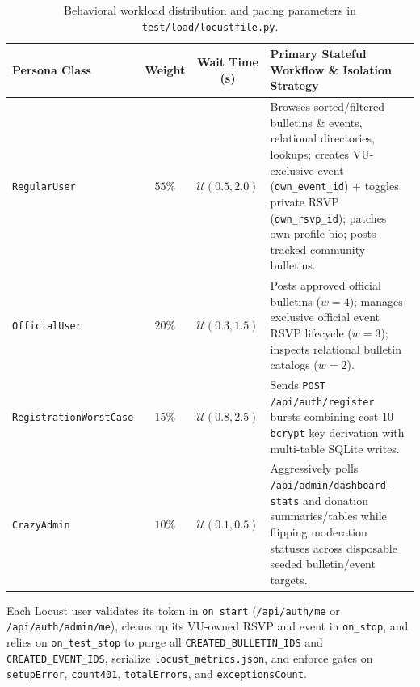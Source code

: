 \documentclass[11pt,letterpaper]{article}
\begin{document}
\begin{table}[H]
\centering
\caption{Behavioral workload distribution and pacing parameters in \texttt{test/load/locustfile.py}.}
\label{tab:personas}
\small
\begin{tabularx}{\textwidth}{@{}l c c X@{}}
\toprule
\textbf{Persona Class} & \textbf{Weight} & \textbf{Wait Time (s)} & \textbf{Primary Stateful Workflow \& Isolation Strategy} \\
\midrule
\texttt{RegularUser} & $55\%$ & $\mathcal{U}(0.5, 2.0)$ & Browses sorted/filtered bulletins \& events, relational directories, lookups; creates VU-exclusive event (\texttt{own\_event\_id}) + toggles private RSVP (\texttt{own\_rsvp\_id}); patches own profile bio; posts tracked community bulletins. \\
\texttt{OfficialUser} & $20\%$ & $\mathcal{U}(0.3, 1.5)$ & Posts approved official bulletins ($w=4$); manages exclusive official event RSVP lifecycle ($w=3$); inspects relational bulletin catalogs ($w=2$). \\
\texttt{RegistrationWorstCase} & $15\%$ & $\mathcal{U}(0.8, 2.5)$ & Sends \texttt{POST /api/auth/register} bursts combining cost-$10$ \texttt{bcrypt} key derivation with multi-table SQLite writes. \\
\texttt{CrazyAdmin} & $10\%$ & $\mathcal{U}(0.1, 0.5)$ & Aggressively polls \texttt{/api/admin/dashboard-stats} and donation summaries/tables while flipping moderation statuses across disposable seeded bulletin/event targets. \\
\bottomrule
\end{tabularx}
\end{table}

Each Locust user validates its token in \texttt{on\_start} (\texttt{/api/auth/me} or \texttt{/api/auth/admin/me}), cleans up its VU-owned RSVP and event in \texttt{on\_stop}, and relies on \texttt{on\_test\_stop} to purge all \texttt{CREATED\_BULLETIN\_IDS} and \texttt{CREATED\_EVENT\_IDS}, serialize \texttt{locust\_metrics.json}, and enforce gates on \texttt{setupError}, \texttt{count401}, \texttt{totalErrors}, and \texttt{exceptionsCount}.
\end{document}

